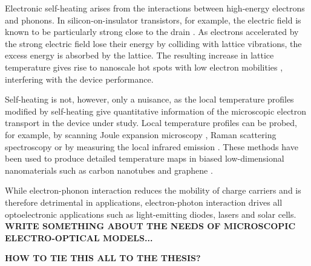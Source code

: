 Electronic self-heating arises from the interactions between high-energy electrons and phonons. In silicon-on-insulator transistors, for example, the electric field is known to be particularly strong close to the drain \cite{pop06_ieee}. As electrons accelerated by the strong electric field lose their energy by colliding with lattice vibrations, the excess energy is absorbed by the lattice. The resulting increase in lattice temperature gives rise to nanoscale hot spots with low electron mobilities \cite{pop06_ieee}, interfering with the device performance.  %

Self-heating is not, however, only a nuisance, as the local temperature profiles modified by self-heating give quantitative information of the microscopic electron transport in the device under study. Local temperature profiles can be probed, for example, by scanning Joule expansion microscopy \cite{varesi98}, Raman scattering spectroscopy \cite{calizo07} or by measuring the local infrared emission \cite{bae10}. These methods have been used to produce detailed temperature maps in biased low-dimensional nanomaterials such as carbon nanotubes \cite{estrada11,xie12} and graphene \cite{bae10,freitag09,chae10,freitag10}.

While electron-phonon interaction reduces the mobility of charge carriers and is therefore detrimental in applications, electron-photon interaction drives all optoelectronic applications such as light-emitting diodes, lasers and solar cells. \textbf{WRITE SOMETHING ABOUT THE NEEDS OF MICROSCOPIC ELECTRO-OPTICAL MODELS...}

\textbf{HOW TO TIE THIS ALL TO THE THESIS?}



